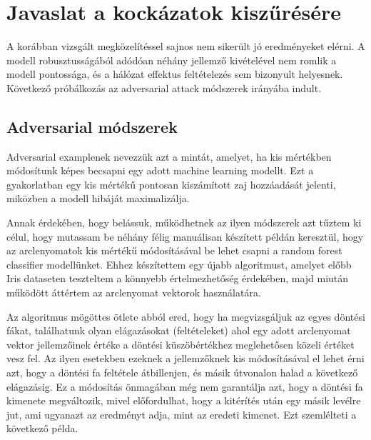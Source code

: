 \section{Javaslat a kockázatok kiszűrésére}
\label{sec:6}
A korábban vizsgált megközelítéssel sajnos nem sikerült jó eredményeket elérni. A modell robusztusságából adódóan néhány jellemző kivételével nem romlik a modell pontossága, és a hálózat effektus feltételezés sem bizonyult helyesnek. Következő próbálkozás az adversarial attack módszerek irányába indult. 

\subsection{Adversarial módszerek}

Adversarial examplenek nevezzük azt a mintát, amelyet, ha kis mértékben módosítunk képes becsapni egy adott machine learning modellt. Ezt a gyakorlatban egy kis mértékű pontosan kiszámított zaj hozzáadását jelenti, miközben a modell hibáját maximalizálja. 

Annak érdekében, hogy belássuk, működhetnek az ilyen módszerek azt tűztem ki célul, hogy mutassam be néhány félig manuálisan készített példán keresztül, hogy az arclenyomatok kis mértékű módosításával be lehet csapni a random forest classifier modellünket. Ehhez készítettem egy újabb algoritmust, amelyet előbb Iris dataseten teszteltem a könnyebb értelmezhetőség érdekében, majd miután működött áttértem az arclenyomat vektorok használatára.

Az algoritmus mögöttes ötlete abból ered, hogy ha megvizsgáljuk az egyes döntési fákat, találhatunk olyan elágazásokat (feltételeket) ahol egy adott arclenyomat vektor jellemzőinek értéke a döntési küszöbértékhez meglehetősen közeli értéket vesz fel. Az ilyen esetekben ezeknek a jellemzőknek kis módosításával el lehet érni azt, hogy a döntési fa feltétele átbillenjen, és másik útvonalon halad a következő elágazásig. Ez a módosítás önmagában még nem garantálja azt, hogy a döntési fa kimenete megváltozik, mivel előfordulhat, hogy a kitérítés után egy másik levélre jut, ami ugyanazt az eredményt adja, mint az eredeti kimenet. Ezt szemlélteti a következő példa.

